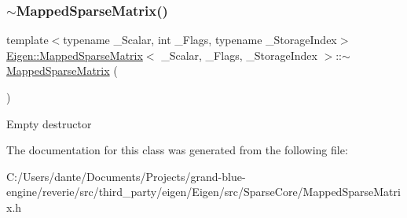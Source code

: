 \subsubsection{\texorpdfstring{$\sim$MappedSparseMatrix()}{~MappedSparseMatrix()}}
{\footnotesize\ttfamily template$<$typename \+\_\+\+Scalar, int \+\_\+\+Flags, typename \+\_\+\+Storage\+Index$>$ \\
\mbox{\hyperlink{class_eigen_1_1_mapped_sparse_matrix}{Eigen\+::\+Mapped\+Sparse\+Matrix}}$<$ \+\_\+\+Scalar, \+\_\+\+Flags, \+\_\+\+Storage\+Index $>$\+::$\sim$\mbox{\hyperlink{class_eigen_1_1_mapped_sparse_matrix}{Mapped\+Sparse\+Matrix}} (\begin{DoxyParamCaption}{ }\end{DoxyParamCaption})\hspace{0.3cm}{\ttfamily [inline]}}

Empty destructor 

The documentation for this class was generated from the following file\+:\begin{DoxyCompactItemize}
\item 
C\+:/\+Users/dante/\+Documents/\+Projects/grand-\/blue-\/engine/reverie/src/third\+\_\+party/eigen/\+Eigen/src/\+Sparse\+Core/Mapped\+Sparse\+Matrix.\+h\end{DoxyCompactItemize}
